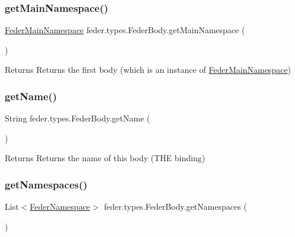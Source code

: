 \subsubsection{\texorpdfstring{get\+Main\+Namespace()}{getMainNamespace()}}
{\footnotesize\ttfamily \hyperlink{classfeder_1_1types_1_1FederMainNamespace}{Feder\+Main\+Namespace} feder.\+types.\+Feder\+Body.\+get\+Main\+Namespace (\begin{DoxyParamCaption}{ }\end{DoxyParamCaption})}

\begin{DoxyReturn}{Returns}
Returns the \textquotesingle{}first\textquotesingle{} body (which is an instance of \hyperlink{classfeder_1_1types_1_1FederMainNamespace}{Feder\+Main\+Namespace}) 
\end{DoxyReturn}
\mbox{\label{classfeder_1_1types_1_1FederBody_a7d32aee068f32d2cc132df84b32f16c2}} 
\subsubsection{\texorpdfstring{get\+Name()}{getName()}}
{\footnotesize\ttfamily String feder.\+types.\+Feder\+Body.\+get\+Name (\begin{DoxyParamCaption}{ }\end{DoxyParamCaption})}

\begin{DoxyReturn}{Returns}
Returns the name of this body (T\+HE binding) 
\end{DoxyReturn}
\mbox{\label{classfeder_1_1types_1_1FederBody_a8921df8000dc7b7c5894f4871f162cfb}} 
\subsubsection{\texorpdfstring{get\+Namespaces()}{getNamespaces()}}
{\footnotesize\ttfamily List$<$\hyperlink{classfeder_1_1types_1_1FederNamespace}{Feder\+Namespace}$>$ feder.\+types.\+Feder\+Body.\+get\+Namespaces (\begin{DoxyParamCaption}{ }\end{DoxyParamCaption})}


